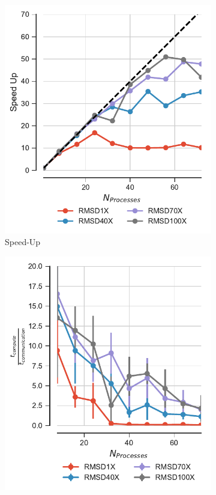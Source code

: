 \begin{figure}[ht!]
\centering
\begin{subfigure} {.33\textwidth}
  \includegraphics[width=\linewidth]{figures/Compute_to_IO_ratio_on_performance_2d_v17.pdf}
  \caption{Speed-Up}
  \label{fig:S1_tcomp_tcomm_effect}
\end{subfigure}
\hfill
\begin{subfigure}{.3\textwidth}
  \includegraphics[width=\linewidth]{figures/Compute_to_comm_ratio_on_performance_v17.pdf}

\end{subfigure}
\end{figure}
